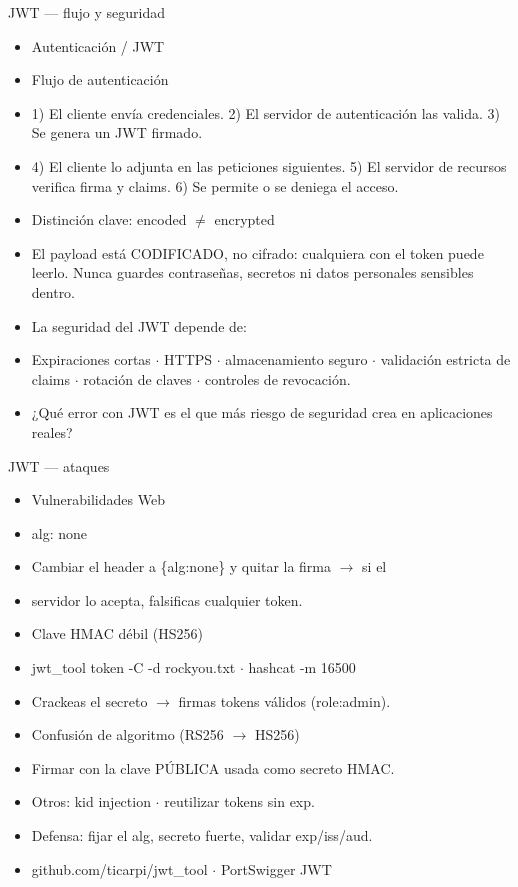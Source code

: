 \documentclass[aspectratio=169,10pt]{beamer}
\begin{document}
\begin{frame}[allowframebreaks]{JWT --- flujo y seguridad}
\small
  \begin{itemize}
  \item Autenticación / JWT
  \item Flujo de autenticación
  \item 1) El cliente envía credenciales. 2) El servidor de autenticación las valida. 3) Se genera un JWT firmado.
  \item 4) El cliente lo adjunta en las peticiones siguientes. 5) El servidor de recursos verifica firma y claims. 6) Se permite o se deniega el acceso.
  \item Distinción clave: encoded $\neq$ encrypted
  \item El payload está CODIFICADO, no cifrado: cualquiera con el token puede leerlo. Nunca guardes contraseñas, secretos ni datos personales sensibles dentro.
  \item La seguridad del JWT depende de:
  \item Expiraciones cortas $\cdot$ HTTPS $\cdot$ almacenamiento seguro $\cdot$ validación estricta de claims $\cdot$ rotación de claves $\cdot$ controles de revocación.
  \item ¿Qué error con JWT es el que más riesgo de seguridad crea en aplicaciones reales?
  \end{itemize}
\end{frame}

\begin{frame}[allowframebreaks]{JWT --- ataques}
\small
  \begin{itemize}
  \item Vulnerabilidades Web
  \item alg: none
  \item Cambiar el header a \{\textquotedbl{}alg\textquotedbl{}:\textquotedbl{}none\textquotedbl{}\} y quitar la firma $\rightarrow$ si el
  \item servidor lo acepta, falsificas cualquier token.
  \item Clave HMAC débil (HS256)
  \item jwt\_tool token -C -d rockyou.txt $\cdot$ hashcat -m 16500
  \item Crackeas el secreto $\rightarrow$ firmas tokens válidos (role:admin).
  \item Confusión de algoritmo (RS256 $\rightarrow$ HS256)
  \item Firmar con la clave PÚBLICA usada como secreto HMAC.
  \item Otros: kid injection $\cdot$ reutilizar tokens sin exp.
  \item Defensa: fijar el alg, secreto fuerte, validar exp/iss/aud.
  \item github.com/ticarpi/jwt\_tool $\cdot$ PortSwigger JWT
  \end{itemize}
\end{frame}
\end{document}
